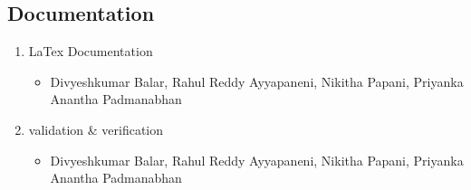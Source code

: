 \documentclass[a4paper, 11pt]{article}
\begin{document}
\subsection{Documentation}
\begin{enumerate}
   \item LaTex Documentation
   \begin{itemize}
     \item Divyeshkumar Balar, Rahul Reddy Ayyapaneni, Nikitha Papani, Priyanka Anantha Padmanabhan
   \end{itemize}
   \item validation \& verification
   \begin{itemize}
     \item Divyeshkumar Balar, Rahul Reddy Ayyapaneni, Nikitha Papani, Priyanka Anantha Padmanabhan
   \end{itemize}
\end{enumerate}
	
\end{document}
